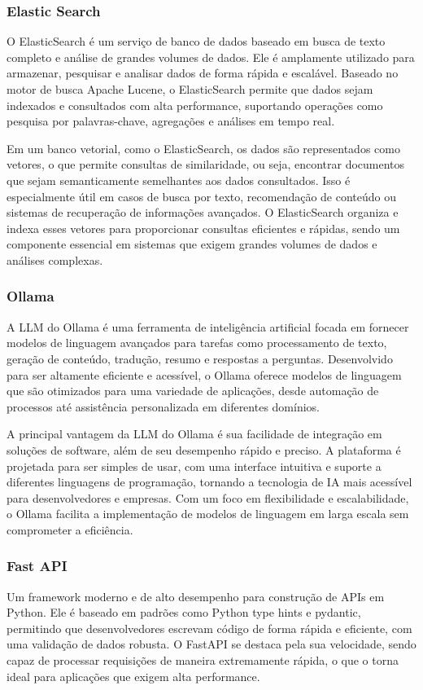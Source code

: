 \documentclass[a4paper, 12pt]{article}
\begin{document}
    \subsubsection{Elastic Search}
    O ElasticSearch é um serviço de banco de dados baseado em busca de texto completo e análise de grandes volumes de dados. Ele é amplamente utilizado para armazenar, pesquisar e analisar dados de forma rápida e escalável. Baseado no motor de busca Apache Lucene, o ElasticSearch permite que dados sejam indexados e consultados com alta performance, suportando operações como pesquisa por palavras-chave, agregações e análises em tempo real.

    Em um banco vetorial, como o ElasticSearch, os dados são representados como vetores, o que permite consultas de similaridade, ou seja, encontrar documentos que sejam semanticamente semelhantes aos dados consultados. Isso é especialmente útil em casos de busca por texto, recomendação de conteúdo ou sistemas de recuperação de informações avançados. O ElasticSearch organiza e indexa esses vetores para proporcionar consultas eficientes e rápidas, sendo um componente essencial em sistemas que exigem grandes volumes de dados e análises complexas.

    \subsubsection{Ollama}
    A LLM do Ollama é uma ferramenta de inteligência artificial focada em fornecer modelos de linguagem avançados para tarefas como processamento de texto, geração de conteúdo, tradução, resumo e respostas a perguntas. Desenvolvido para ser altamente eficiente e acessível, o Ollama oferece modelos de linguagem que são otimizados para uma variedade de aplicações, desde automação de processos até assistência personalizada em diferentes domínios.

    A principal vantagem da LLM do Ollama é sua facilidade de integração em soluções de software, além de seu desempenho rápido e preciso. A plataforma é projetada para ser simples de usar, com uma interface intuitiva e suporte a diferentes linguagens de programação, tornando a tecnologia de IA mais acessível para desenvolvedores e empresas. Com um foco em flexibilidade e escalabilidade, o Ollama facilita a implementação de modelos de linguagem em larga escala sem comprometer a eficiência.

    \subsubsection{Fast API}
    Um framework moderno e de alto desempenho para construção de APIs em Python. Ele é baseado em padrões como Python type hints e pydantic, permitindo que desenvolvedores escrevam código de forma rápida e eficiente, com uma validação de dados robusta. O FastAPI se destaca pela sua velocidade, sendo capaz de processar requisições de maneira extremamente rápida, o que o torna ideal para aplicações que exigem alta performance.
\end{document}
